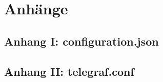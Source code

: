 \documentclass[a4paper, 12pt, oneside, toc=listofnumbered, bibliography=totoc]{scrbook}
\begin{document}
	
	
	\printbibliography
	\frontmatter
	
	\pagebreak
	\chapter{Anhänge} %
	\section*{Anhang I: configuration.json}
	
	\pagebreak
	\section*{Anhang II: telegraf.conf}
	
	\pagebreak
\end{document}
